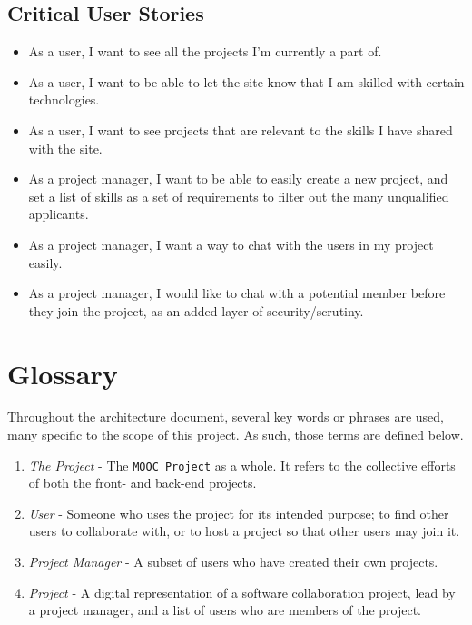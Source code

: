 \documentclass[a4paper, 12pt]{article}
\newcommand{\projectTitle}{\texttt{MOOC Project} }
\begin{document}
	\subsection{Critical User Stories}
		\begin{itemize}
			\item As a user, I want to see all the projects I'm currently a part of.
			\item As a user, I want to be able to let the site know that I am skilled with certain technologies.
			\item As a user, I want to see projects that are relevant to the skills I have shared with the site.
			\item As a project manager, I want to be able to easily create a new project, and set a list of skills as a set of requirements to filter out the many unqualified applicants.
			\item As a project manager, I want a way to chat with the users in my project easily.
			\item As a project manager, I would like to chat with a potential member before they join the project, as an added layer of security/scrutiny.
		\end{itemize}

\section{Glossary}
	Throughout the architecture document, several key words or phrases are used, many specific to the scope of this project. As such, those terms are defined below.

	\begin{enumerate}
		\item \emph{The Project} - The \projectTitle as a whole. It refers to the collective efforts of both the front- and back-end projects.

		\item \emph{User} - Someone who uses the project for its intended purpose; to find other users to collaborate with, or to host a project so that other users may join it.

		\item \emph{Project Manager} - A subset of users who have created their own projects.

		\item \emph{Project} - A digital representation of a software collaboration project, lead by a project manager, and a list of users who are members of the project.

	\end{enumerate}
\end{document}
